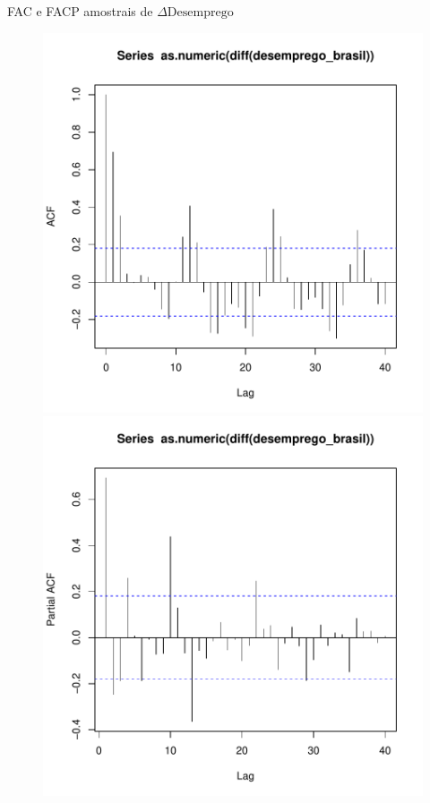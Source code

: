 \documentclass[11pt]{beamer}
\begin{document}
\begin{frame}{FAC e FACP amostrais de $\Delta \text{Desemprego}$}
	\begin{figure}
		\includegraphics[scale=0.39]{graficos/acf_unemp.pdf} 		\includegraphics[scale=0.39]{graficos/pacf_unemp.pdf}
	\end{figure}
\end{frame}
\end{document}
